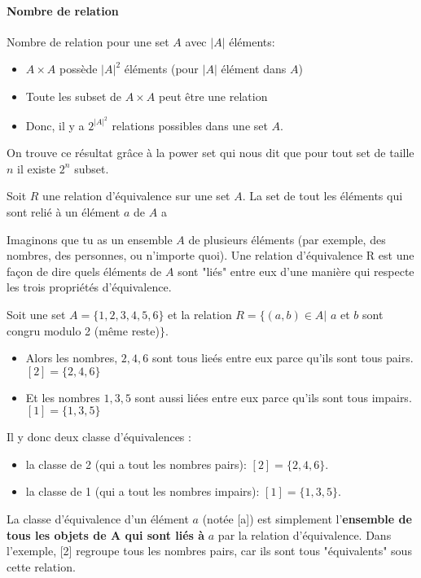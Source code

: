 \paragraph{Nombre de relation}
Nombre de relation pour une set $A$ avec $|A|$ éléments:
\begin{itemize}
    \item $A \times A$ possède $|A|^2$ éléments (pour $|A|$ élément dans $A$)
    \item Toute les subset de $A \times A$ peut être une relation
    \item Donc, il y a $2^{|A|^2}$ relations possibles dans une set $A$.
\end{itemize}
On trouve ce résultat grâce à la power set qui nous dit que pour tout set de taille $n$ il existe $2^n$ subset.

\begin{definition}
    Soit $R$ une relation d'équivalence sur une set $A$. La set de tout les éléments qui sont relié à un élément $a$ de $A$ a
\end{definition}
Imaginons que tu as un ensemble $A$ de plusieurs éléments (par exemple, des nombres, des personnes, ou n'importe quoi). Une relation d'équivalence R est une façon de dire quels éléments de $A$ sont "liés" entre eux d'une manière qui respecte les trois propriétés d'équivalence.
\\
\begin{exemple}
    
Soit une set $A = \{1, 2, 3, 4, 5, 6\}$ et la relation $R = \{(a, b) \in A|$ $a$ et $b$ sont congru modulo 2 (même reste)$\}$.
\begin{itemize}
    \item Alors les nombres, $2, 4, 6$ sont tous lieés entre eux parce qu'ils sont tous pairs. $[2] = \{2, 4, 6\}$
    \item Et les nombres $1, 3, 5$ sont aussi liées entre eux parce qu'ils sont tous impairs. $[1] = \{1, 3, 5\}$
\end{itemize}
Il y donc deux classe d'équivalences : 
\begin{itemize}
    \item la classe de 2 (qui a tout les nombres pairs):  $[2] = \{2, 4, 6\}$.
    \item la classe de 1 (qui a tout les nombres impairs):   $[1] = \{1, 3, 5\}$.
\end{itemize}
La classe d'équivalence d'un élément $a$ (notée [a]) est simplement l'\textbf{ensemble de tous les objets de A qui sont liés à }$a$ par la relation d'équivalence. Dans l'exemple, [2] regroupe tous les nombres pairs, car ils sont tous "équivalents" sous cette relation.
\end{exemple}

